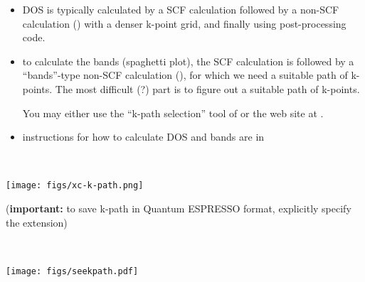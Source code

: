 \documentclass[landscape]{foils}
\begin{document}
\begin{itemize}
\item DOS is typically calculated by a  SCF calculation
  followed by a  non-SCF calculation () with a denser k-point grid, and finally using
   post-processing code.

\item to calculate the bands (spaghetti plot), the  SCF
  calculation is followed by a  ``bands''-type non-SCF
  calculation (), for which we need a
  suitable path of k-points. The most difficult (?) part is to figure
  out a suitable path of k-points.

  You may either use the ``k-path selection'' tool of 
  or the  web site at
  .

\item instructions for how to calculate DOS and bands are in 
\end{itemize}

~\\[-1.5em]
\centerline{\texttt{[image: figs/xc-k-path.png]}}
{\small ({\bf important:} to save k-path in Quantum ESPRESSO format, explicitly
specify the  extension)}

~\\
\centerline{\texttt{[image: figs/seekpath.pdf]}}
\end{document}
